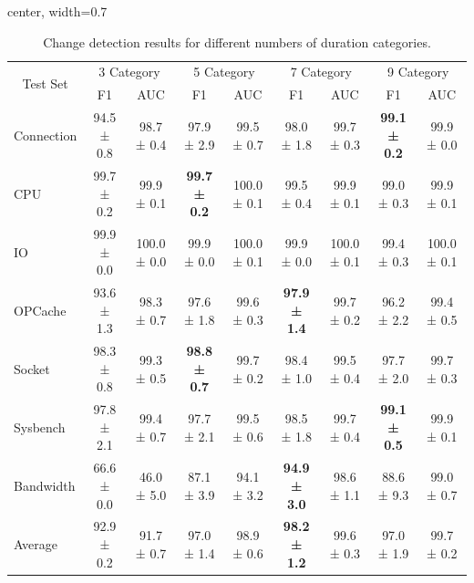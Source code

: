 \documentclass[preprint,12pt]{elsarticle}
\begin{document}
\begin{table}[tb]
\centering
\caption{Change detection results for different numbers of duration categories.}
\label{tab:duration-models}
\begin{adjustbox}{center, width=0.7\textwidth}
\begin{tabular}{|lll|cc|cc|cc|cc|}
\hline
\multicolumn{3}{|c|}{\multirow{2}{*}{Test Set}} & \multicolumn{2}{c|}{3 Category} & \multicolumn{2}{c|}{5 Category} & \multicolumn{2}{c|}{7 Category} & \multicolumn{2}{c|}{9 Category} \\
\multicolumn{3}{|c|}{}                         & \multicolumn{1}{c}{F1}  & AUC  & \multicolumn{1}{c}{F1}  & AUC  & \multicolumn{1}{c}{F1}  & AUC  & \multicolumn{1}{c}{F1}  & AUC \\ \hline
\multicolumn{3}{|l|}{Connection}          & 94.5 ± 0.8 & 98.7 ± 0.4 & 97.9 ± 2.9   & 99.5 ± 0.7 & 98.0 ± 1.8     & 99.7 ± 0.3 & \textbf{99.1 ± 0.2} & 99.9 ± 0.0 \\
\multicolumn{3}{|l|}{CPU}                 & 99.7 ± 0.2 & 99.9 ± 0.1 & \textbf{99.7 ± 0.2}   & 100.0 ± 0.1 & 99.5 ± 0.4    & 99.9 ± 0.1 & 99.0 ± 0.3 & 99.9 ± 0.1 \\
\multicolumn{3}{|l|}{IO}                  & 99.9 ± 0.0 & 100.0 ± 0.0 & 99.9 ± 0.0  & 100.0 ± 0.1 & 99.9 ± 0.0   & 100.0 ± 0.1 & 99.4 ± 0.3 & 100.0 ± 0.1 \\
\multicolumn{3}{|l|}{OPCache}             & 93.6 ± 1.3 & 98.3 ± 0.7 & 97.6 ± 1.8   & 99.6 ± 0.3 & \textbf{97.9 ± 1.4}     & 99.7 ± 0.2 & 96.2 ± 2.2 & 99.4 ± 0.5 \\
\multicolumn{3}{|l|}{Socket}              & 98.3 ± 0.8 & 99.3 ± 0.5 & \textbf{98.8 ± 0.7}   & 99.7 ± 0.2 & 98.4 ± 1.0     & 99.5 ± 0.4 & 97.7 ± 2.0 & 99.7 ± 0.3 \\
\multicolumn{3}{|l|}{Sysbench}            & 97.8 ± 2.1 & 99.4 ± 0.7 & 97.7 ± 2.1   & 99.5 ± 0.6 & 98.5 ± 1.8     & 99.7 ± 0.4 & \textbf{99.1 ± 0.5} & 99.9 ± 0.1 \\
\multicolumn{3}{|l|}{Bandwidth}           & 66.6 ± 0.0 & 46.0 ± 5.0 & 87.1 ± 3.9   & 94.1 ± 3.2 & \textbf{94.9 ± 3.0}     & 98.6 ± 1.1 & 88.6 ± 9.3 & 99.0 ± 0.7 \\ \hline
\multicolumn{3}{|l|}{Average}                  & 92.9 ± 0.2 & 91.7 ± 0.7 & 97.0 ± 1.4   & 98.9 ± 0.6 & \textbf{98.2 ± 1.2}     & 99.6 ± 0.3 & 97.0 ± 1.9 & 99.7 ± 0.2 \\ \hline
\end{tabular}
\end{adjustbox}
\end{table}
\end{document}

